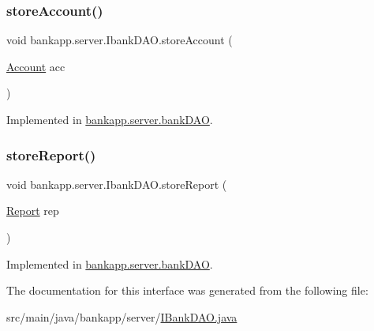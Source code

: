 \subsubsection{\texorpdfstring{store\+Account()}{storeAccount()}}
{\footnotesize\ttfamily void bankapp.\+server.\+Ibank\+D\+A\+O.\+store\+Account (\begin{DoxyParamCaption}\item[{\hyperlink{classbankapp_1_1server_1_1_account}{Account}}]{acc }\end{DoxyParamCaption})}



Implemented in \hyperlink{classbankapp_1_1server_1_1bank_d_a_o_a0023f065d21c23dd9b952339fd832d7e}{bankapp.\+server.\+bank\+D\+AO}.

\mbox{\label{interfacebankapp_1_1server_1_1_ibank_d_a_o_a8990d1f4e0ffb741d459cebe172e47e0}} 
\subsubsection{\texorpdfstring{store\+Report()}{storeReport()}}
{\footnotesize\ttfamily void bankapp.\+server.\+Ibank\+D\+A\+O.\+store\+Report (\begin{DoxyParamCaption}\item[{\hyperlink{classbankapp_1_1server_1_1_report}{Report}}]{rep }\end{DoxyParamCaption})}



Implemented in \hyperlink{classbankapp_1_1server_1_1bank_d_a_o_a1909f3eb0622fb32291c0d1969bdf5df}{bankapp.\+server.\+bank\+D\+AO}.



The documentation for this interface was generated from the following file\+:\begin{DoxyCompactItemize}
\item 
src/main/java/bankapp/server/\hyperlink{_i_bank_d_a_o_8java}{I\+Bank\+D\+A\+O.\+java}\end{DoxyCompactItemize}
